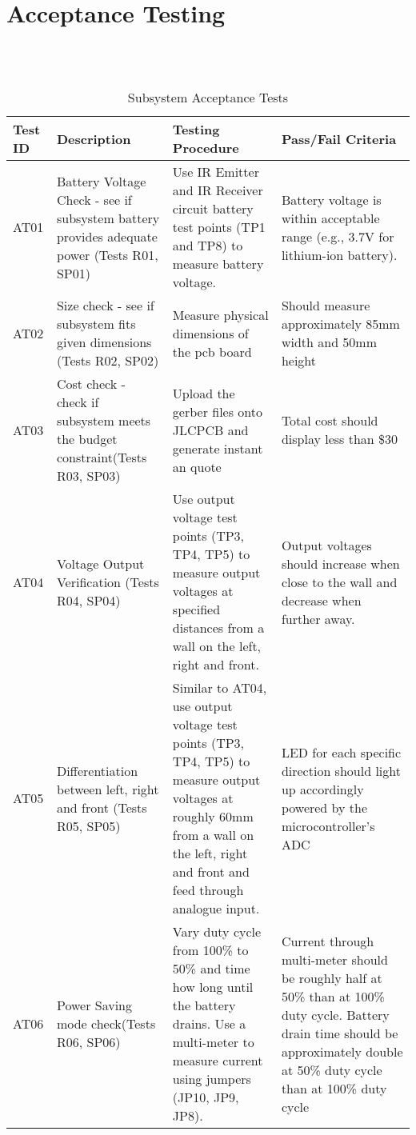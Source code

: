 \documentclass[class=report,11pt,crop=false]{standalone}
\begin{document}
\chapter{Acceptance Testing} \label{ch:atp}
\vspace{-1cm}
\\ \\
\begin{table}[h]
  \centering
    \caption{Subsystem Acceptance Tests}
    \label{tab:tests}
    \begin{tabular}{ >{\centering\arraybackslash}m{1cm}  m{4cm} m{5cm} m{5cm}}
      \hline
      \textbf{Test ID} & \textbf{Description} & \textbf{Testing Procedure}& \textbf{Pass/Fail Criteria} \\   
      \hline
      AT01 & Battery Voltage Check - see if subsystem battery provides adequate power (Tests R01, SP01)  & Use IR Emitter and IR Receiver circuit battery test points (TP1 and TP8) to measure battery voltage. & Battery voltage is within acceptable range (e.g., 3.7V for lithium-ion battery). \\
       \hline
      AT02 & Size check - see if subsystem fits given dimensions (Tests R02, SP02) & Measure physical dimensions of the pcb board & Should measure approximately 85mm width and 50mm height \\
       \hline
      AT03 & Cost check - check if subsystem meets the budget constraint(Tests R03, SP03)  & Upload the gerber files onto JLCPCB and generate instant an quote & Total cost should display less than \$30 \\
      \hline
      AT04 & Voltage Output Verification (Tests R04, SP04)  & Use output voltage test points (TP3, TP4, TP5) to measure output voltages at specified distances from a wall on the left, right and front. & Output voltages should increase when close to the wall and decrease when further away. \\
      \hline
      AT05 & Differentiation between left, right and front (Tests R05, SP05) & Similar to AT04, use output voltage test points (TP3, TP4, TP5) to measure output voltages at roughly 60mm from a wall on the left, right and front and feed through analogue input. & LED for each specific direction should light up accordingly powered by the microcontroller's ADC \\
      \hline
      AT06 & Power Saving mode check(Tests R06, SP06)  & Vary duty cycle from 100\% to 50\% and time how long until the battery drains. Use a multi-meter to measure current using jumpers (JP10, JP9, JP8). &  Current through multi-meter should be roughly half at 50\% than at 100\% duty cycle. Battery drain time should be approximately double at 50\% duty cycle than at 100\% duty cycle  \\
      \hline
    \end{tabular}
\end{table}



\ifstandalone

\fi
\end{document}
